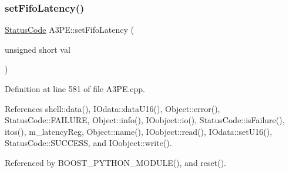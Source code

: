 \subsubsection{\texorpdfstring{set\+Fifo\+Latency()}{setFifoLatency()}}
{\footnotesize\ttfamily \hyperlink{classStatusCode}{Status\+Code} A3\+P\+E\+::set\+Fifo\+Latency (\begin{DoxyParamCaption}\item[{unsigned short}]{val }\end{DoxyParamCaption})}



Definition at line 581 of file A3\+P\+E.\+cpp.



References shell\+::data(), I\+Odata\+::data\+U16(), Object\+::error(), Status\+Code\+::\+F\+A\+I\+L\+U\+RE, Object\+::info(), I\+Oobject\+::io(), Status\+Code\+::is\+Failure(), itos(), m\+\_\+latency\+Reg, Object\+::name(), I\+Oobject\+::read(), I\+Odata\+::set\+U16(), Status\+Code\+::\+S\+U\+C\+C\+E\+SS, and I\+Oobject\+::write().



Referenced by B\+O\+O\+S\+T\+\_\+\+P\+Y\+T\+H\+O\+N\+\_\+\+M\+O\+D\+U\+L\+E(), and reset().


